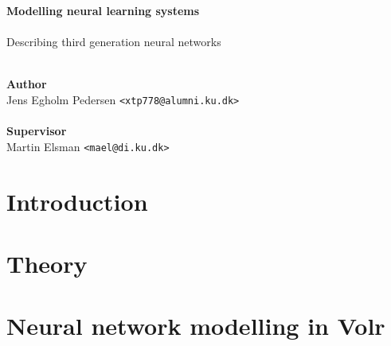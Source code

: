 \documentclass[a4paper,oneside]{memoir}
\begin{document}
    \thispagestyle{empty}
    \begin{adjustwidth}{-3cm}{-1.5cm}
      \vspace*{1cm}
      \textbf{\Huge Modelling neural learning systems} \\
      \\[0.5cm]
      \vspace*{1cm}
      {\huge Describing third generation neural networks}\\
      \begin{tabbing}
      \\
      \textbf{\Large Author} \\
      Jens Egholm Pedersen \hspace{1cm} \= \texttt{<xtp778@alumni.ku.dk>} \\
      \\[13cm]
      \textbf{\Large Supervisor} \\
      Martin Elsman \hspace{1cm} \= \texttt{<mael@di.ku.dk>}
      \end{tabbing}
    \end{adjustwidth}

    \newpage

    \ClearWallPaper

\renewcommand\cftchapteraftersnumb{\normalfont}
\renewcommand\cftbeforechapterskip{5pt plus 1pt}

\frontmatter
\setcounter{tocdepth}{2}
\tableofcontents*
\newpage

\mainmatter
\chapter{Introduction} \label{sec:intro}
  

\chapter{Theory}
  

\chapter{Neural network modelling in Volr} \label{sec:volr}
  
\end{document}
